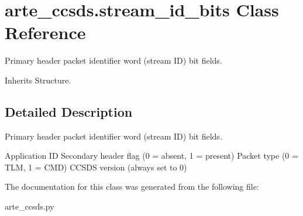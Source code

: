 \section{arte\+\_\+ccsds.\+stream\+\_\+id\+\_\+bits Class Reference}
\label{classarte__ccsds_1_1stream__id__bits}


Primary header packet identifier word (stream ID) bit fields.  




Inherits Structure.



\subsection{Detailed Description}
Primary header packet identifier word (stream ID) bit fields. 

Application ID Secondary header flag (0 = absent, 1 = present) Packet type (0 = T\+LM, 1 = C\+MD) C\+C\+S\+DS version (always set to 0) 

The documentation for this class was generated from the following file\+:\begin{DoxyCompactItemize}
\item 
arte\+\_\+ccsds.\+py\end{DoxyCompactItemize}
